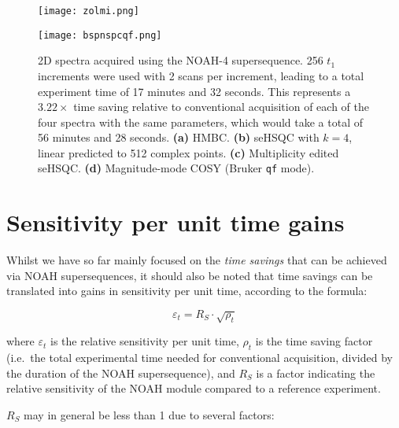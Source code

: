 \begin{figure}
    \centering
    \texttt{[image: zolmi.png]}\phantom{aaaaaa}

    \texttt{[image: bspnspcqf.png]}
    \caption{
        2D spectra acquired using the NOAH-4  supersequence.
        256 $t_1$ increments were used with 2 scans per increment, leading to a total experiment time of 17 minutes and 32 seconds.
        This represents a $3.22\times$ time saving relative to conventional acquisition of each of the four spectra with the same parameters, which would take a total of 56 minutes and 28 seconds.
        \textbf{(a)} HMBC.
        \textbf{(b)} \nitrogen{} seHSQC with $k = 4$, linear predicted to 512 complex points.
        \textbf{(c)} Multiplicity edited \carbon{} seHSQC.
        \textbf{(d)} Magnitude-mode COSY (Bruker \texttt{qf} mode).
        \zolmi{}
    }
    \label{fig:bspnspcqf}
\end{figure}

\section{Sensitivity per unit time gains}

Whilst we have so far mainly focused on the \textit{time savings} that can be achieved via NOAH supersequences, it should also be noted that time savings can be translated into gains in sensitivity per unit time, according to the formula:\autocite{Kupce2019JMR,Kupce2021NRMP}

$$\varepsilon_t = R_S \cdot \sqrt{\rho_t}$$

where $\varepsilon_t$ is the relative sensitivity per unit time, $\rho_t$ is the time saving factor (i.e.\ the total experimental time needed for conventional acquisition, divided by the duration of the NOAH supersequence), and $R_S$ is a factor indicating the relative sensitivity of the NOAH module compared to a reference experiment.

$R_S$ may in general be less than 1 due to several factors:

